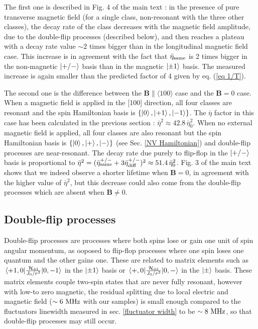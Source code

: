 \documentclass[preprintnumbers,amsmath,amssymb,onecolumn,12pt]{revtex4-2}\usepackage{graphicx}%
\begin{document}
The first one is described in Fig. 4 of the main text : in the presence of pure transverse magnetic field (for a single class, non-resonant with the three other classes), the decay rate of the class decreases with the magnetic field amplitude, due to the double-flip processes (described below), and then reaches a plateau with a decay rate value $\sim 2$ times bigger than in the longitudinal magnetic field case. This increase is in agreement with the fact that $\bar{\eta}_{\rm same}$ is 2 times bigger in the non-magnetic $\ket{+/-}$ basis than in the magnetic $\ket{\pm 1}$ basis. The measured increase is again smaller than the predicted factor of 4 given by eq. (\ref{eq 1/T}).

The second one is the difference between the $\bm{B} \parallel \langle 100 \rangle$ case and the $\bm{B}=0$ case. When a magnetic field is applied in the [100] direction, all four classes are resonant and the spin Hamiltonian basis is $\{ \ket{0},\ket{+1},\ket{-1} \} $. The $\bar \eta$ factor in this case has been calculated in the previous section : $\bar \eta^2\approx 42.8\, \bar \eta_0^2$. When no external magnetic field is applied, all four classes are also resonant but the spin Hamiltonian basis is  $\{ \ket{0},\ket{+},\ket{-} \} $ (see Sec. \ref{NV Hamiltonian}) and double-flip processes are near-resonant. The decay rate due purely to flip-flop in the $\ket{+/-}$ basis is proportional to $\bar \eta^2 = (\bar{\eta}_{\rm same}^{+/-} + 3\bar{\eta}_{\rm diff}^{+/-})^2 \approx 51.4\, \bar \eta_0^2$. Fig. 3 of the main text shows that we indeed observe a shorter lifetime when $\bm B=0$, in agreement with the higher value of $\bar \eta^2$, but this decrease could also come from the double-flip processes which are absent when $\bm B \neq 0$.

\subsection{Double-flip processes}

Double-flip processes are processes where both spins lose or gain one unit of spin angular momentum, as ooposed to flip-flop processes where one spin loses one quantum and the other gains one. These are related to matrix elements  such as $\mel{+1,0}{\frac{\mathcal{H}_{\rm dd}}{J_0/r^3}}{0,-1}$ in the $\ket{\pm 1}$ basis or $\mel{+,0}{\frac{\mathcal{H}_{\rm dd}}{J_0/r^3}}{0,-}$ in the $\ket{\pm}$ basis. These matrix elements couple two-spin states that are never fully resonant, however with low-to zero magnetic, the residual splitting due to local electric and magnetic field ($\sim 6\ \rm MHz$ with our samples) is small enough compared to the fluctuators linewidth  measured in sec. \ref{fluctuator width} to be $\sim 8\ \rm MHz$, so that double-flip processes may still occur.
\end{document}
